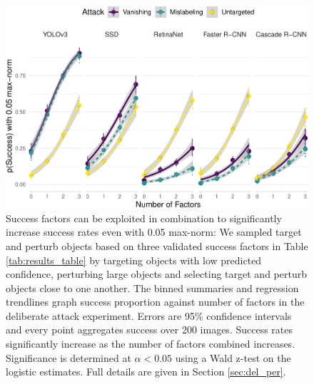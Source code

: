 \begin{figure}[tb]

{\centering \includegraphics[width=1\linewidth]{imgs/biased_trend_graph-normed} 

}

\caption{Success factors can be exploited in combination to significantly increase success rates even with 0.05 max-norm:  We sampled target and perturb objects based on three validated success factors in Table \ref{tab:results_table} by targeting objects with low predicted confidence, perturbing large objects and selecting target and perturb objects close to one another. The binned summaries and regression trendlines graph success proportion against number of factors in the deliberate attack experiment. Errors are 95\% confidence intervals and every point aggregates success over 200 images. Success rates significantly increase as the number of factors combined increases. Significance is determined at $\alpha < 0.05$ using a Wald z-test on the logistic estimates. Full details are given in Section \ref{sec:del_per}.}\label{fig:biased_trend_graph_normed}
\end{figure}


